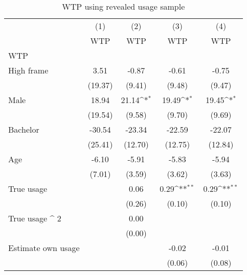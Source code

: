 \begin{table}[htbp]\centering
\def\sym#1{\ifmmode^{#1}\else\(^{#1}\)\fi}
\caption{WTP using revealed usage sample}
\begin{tabular}{l*{4}{c}}
\hline\hline
                &\multicolumn{1}{c}{(1)}&\multicolumn{1}{c}{(2)}&\multicolumn{1}{c}{(3)}&\multicolumn{1}{c}{(4)}\\
                &\multicolumn{1}{c}{WTP}&\multicolumn{1}{c}{WTP}&\multicolumn{1}{c}{WTP}&\multicolumn{1}{c}{WTP}\\
\hline
WTP             &                  &                  &                  &                  \\
High frame      &     3.51         &    -0.87         &    -0.61         &    -0.75         \\
                &  (19.37)         &   (9.41)         &   (9.48)         &   (9.47)         \\
[1em]
Male            &    18.94         &    21.14\sym{*}  &    19.49\sym{*}  &    19.45\sym{*}  \\
                &  (19.54)         &   (9.58)         &   (9.70)         &   (9.69)         \\
[1em]
Bachelor        &   -30.54         &   -23.34         &   -22.59         &   -22.07         \\
                &  (25.41)         &  (12.70)         &  (12.75)         &  (12.84)         \\
[1em]
Age             &    -6.10         &    -5.91         &    -5.83         &    -5.94         \\
                &   (7.01)         &   (3.59)         &   (3.62)         &   (3.63)         \\
[1em]
True usage      &                  &     0.06         &     0.29\sym{**} &     0.29\sym{**} \\
                &                  &   (0.26)         &   (0.10)         &   (0.10)         \\
[1em]
True usage ^ 2  &                  &     0.00         &                  &                  \\
                &                  &   (0.00)         &                  &                  \\
[1em]
Estimate own usage&                  &                  &    -0.02         &    -0.01         \\
                &                  &                  &   (0.06)         &   (0.08)         \\

\end{tabular}
\end{table}
